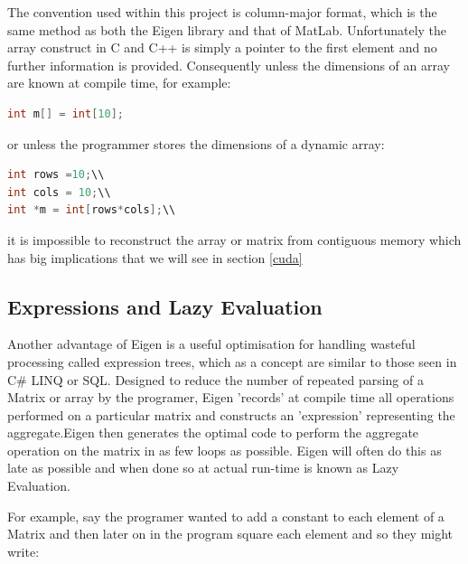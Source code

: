 \documentclass[a4paper]{amsart}
\begin{document}
The convention used within this project is column-major format, which is the same method as both the Eigen library and that of MatLab. Unfortunately the array construct in C and C++ is simply a pointer to the first element and no further information is provided. Consequently unless the dimensions of an array are known at compile time, for example:

\begin{lstlisting}[language=C++]
int m[] = int[10];
\end{lstlisting}

or unless the programmer stores the dimensions of a dynamic array:\\

\begin{lstlisting}[language=C++]
int rows =10;\\
int cols = 10;\\
int *m = int[rows*cols];\\
\end{lstlisting}

it is impossible to reconstruct the array or matrix from contiguous memory which has big implications that we will see in section \ref{cuda}


\subsection{Expressions and Lazy Evaluation}

Another advantage of Eigen is a useful optimisation for handling wasteful processing called expression trees, which as a concept are similar to those seen in C\# LINQ or SQL. Designed to reduce the number of repeated parsing of a Matrix or array by the programer, Eigen 'records' at compile time all operations performed on a particular matrix and constructs an 'expression' representing the aggregate.Eigen then generates the optimal code to perform the aggregate operation on the matrix in as few loops as possible. Eigen will often do this as late as possible and when done so at actual run-time is known as Lazy Evaluation.

For example, say the programer wanted to add a constant to each element of a Matrix and then later on in the program square each element and so they might write:


\end{document}
